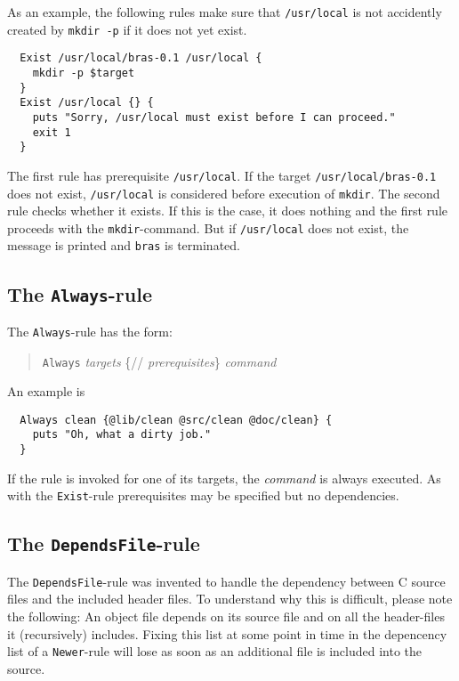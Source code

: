 \documentclass[12pt]{article}
\newcommand{\bras}{\texttt{bras}}
\begin{document}
As an example, the following rules make sure that \texttt{/usr/local}
is not accidently created by \texttt{mkdir -p} if it does not yet
exist.

\begin{verbatim}
  Exist /usr/local/bras-0.1 /usr/local {
    mkdir -p $target
  }
  Exist /usr/local {} {
    puts "Sorry, /usr/local must exist before I can proceed."
    exit 1
  }     
\end{verbatim}

The first rule has prerequisite \texttt{/usr/local}. If the target
\texttt{/usr/local/bras-0.1}
does not exist, \texttt{/usr/local} is considered
before execution of \texttt{mkdir}. The second rule checks whether it
exists. If this is the case, it does nothing and the first rule
proceeds with the \texttt{mkdir}-command. But if
\texttt{/usr/local} does not exist, the message is printed and \bras{}
is terminated.

\subsection{The \texttt{Always}-rule}

The \texttt{Always}-rule has the form:

\begin{quote}
  \texttt{Always} \textit{targets} \{// \textit{prerequisites}\} \textit{command}
\end{quote}

An example is
\begin{verbatim}
  Always clean {@lib/clean @src/clean @doc/clean} {
    puts "Oh, what a dirty job."
  }
\end{verbatim}

If the rule is invoked for one of its targets, the \textit{command} is
always executed. As with the \texttt{Exist}-rule prerequisites may be
specified but no dependencies.

\subsection{The \texttt{DependsFile}-rule}
\label{sec:DependsFile}

The \texttt{DependsFile}-rule was invented to handle the dependency
between C source files and the included header files. To understand
why this is difficult, please note the following: An object file
depends on its source file and on all the header-files it
(recursively) includes. Fixing this list at some point in time in the
depencency list of a \texttt{Newer}-rule will lose as soon as an
additional file is included into the source.
\end{document}
